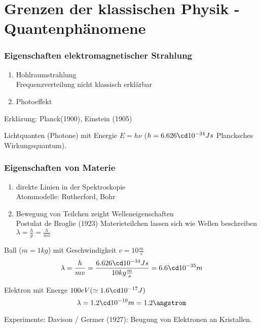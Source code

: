 \section{Grenzen der klassischen Physik - Quantenphänomene} %
\label{sec:Grenzen_der_klassischen_Physik_-_Quantenphänomene}
\subsubsection{Eigenschaften elektromagnetischer Strahlung} %
\label{ssub:Eigenschaften_elektromagnetischer_Strahlung}
\begin{enumerate}
    \item{Hohlraumstrahlung} \\
        Frequenzverteilung nicht klassisch erklärbar
    \item{Photoeffekt}  
\end{enumerate}
Erklärung: Planck(1900), Einstein (1905)

Lichtquanten (Photone) mit Energie $E= h \nu$ ($h=6.626 \cd 10^{-34} Js$
Plancksches Wirkungsquantum).
\subsubsection{Eigenschaften von Materie} %
\label{ssub:Eigenschaften_von_Materie}
\begin{enumerate}
    \item{direkte Linien in der Spektroskopie} \\
        Atommodelle: Rutherford, Bohr
    \item{Bewegung von Teilchen zeight Welleneigenschaften} \\
        Postulat de Broglie (1923)
        Materieteilchen lassen sich wie Wellen beschreiben 
        $\lambda = \frac{h}{p} = \frac{h}{mv}$
\end{enumerate}
\begin{bei}
    \item Ball ($m=1kg$) mit Geschwindigkeit $v = 10 \frac{m}{s}$
     \begin{equation*}
         \lambda = \frac{h}{mv} = \frac{6.626 \cd 10^{-34}Js}{10 kg \frac{m}{s}} 
         = 6.6 \cd 10^{-35} m
     \end{equation*}
    \item Elektron mit Energe $100eV (\simeq 1.6 \cd 10^{-17}J)$
    \begin{equation*}
        \lambda = 1.2 \cd 10^{-10}m = 1.2\angstrom
    \end{equation*}
\end{bei}
Experimente: Davison / Germer (1927): Beugung von Elektronen an Kristallen.
